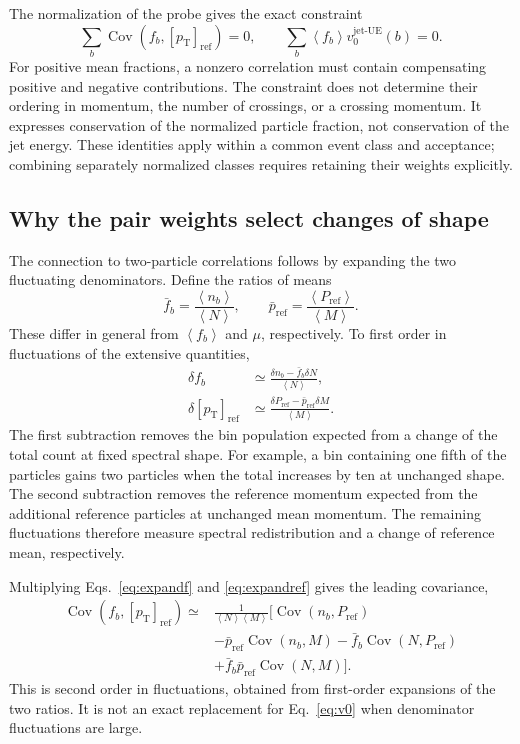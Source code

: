 \documentclass[aps,prc,twocolumn,superscriptaddress,nofootinbib,longbibliography,floatfix,10pt]{revtex4-2}
\newcommand{\vjet}{{v_0^{\mathrm{jet\text{-}UE}}}}
\newcommand{\mpt}{[p_{\mathrm T}]_{\mathrm{ref}}}
\newcommand{\av}[1]{\left\langle #1\right\rangle}
\newcommand{\Cov}{\operatorname{Cov}}
\begin{document}
The normalization of the probe gives the exact constraint
\begin{equation}
 \sum_b\Cov(f_b,\mpt)=0,\qquad
 \sum_b\av{f_b}\vjet(b)=0.
 \label{eq:sumrule}
\end{equation}
For positive mean fractions, a nonzero correlation must contain compensating positive and negative contributions. The constraint does not determine their ordering in momentum, the number of crossings, or a crossing momentum. It expresses conservation of the normalized particle fraction, not conservation of the jet energy. These identities apply within a common event class and acceptance; combining separately normalized classes requires retaining their weights explicitly.

\subsection{Why the pair weights select changes of shape}
The connection to two-particle correlations follows by expanding the two fluctuating denominators. Define the ratios of means
\begin{equation}
 \bar f_b=\frac{\av{n_b}}{\av N},\qquad
 \bar p_{\mathrm{ref}}=\frac{\av{P_{\mathrm{ref}}}}{\av M}.
 \label{eq:means}
\end{equation}
These differ in general from $\av{f_b}$ and $\mu$, respectively. To first order in fluctuations of the extensive quantities,
\begin{align}
 \delta f_b&\simeq\frac{\delta n_b-\bar f_b\delta N}{\av N},\label{eq:expandf}\\
 \delta\mpt&\simeq\frac{\delta P_{\mathrm{ref}}-\bar p_{\mathrm{ref}}\delta M}{\av M}.
 \label{eq:expandref}
\end{align}
The first subtraction removes the bin population expected from a change of the total count at fixed spectral shape. For example, a bin containing one fifth of the particles gains two particles when the total increases by ten at unchanged shape. The second subtraction removes the reference momentum expected from the additional reference particles at unchanged mean momentum. The remaining fluctuations therefore measure spectral redistribution and a change of reference mean, respectively.

Multiplying Eqs.~\eqref{eq:expandf} and \eqref{eq:expandref} gives the leading covariance,
\begin{align}
 \Cov(f_b,\mpt)\simeq{}&\frac{1}{\av N\av M}\Big[\Cov(n_b,P_{\mathrm{ref}})\nonumber\\
 &-\bar p_{\mathrm{ref}}\Cov(n_b,M)
 -\bar f_b\Cov(N,P_{\mathrm{ref}})\nonumber\\
 &+\bar f_b\bar p_{\mathrm{ref}}\Cov(N,M)\Big].
 \label{eq:fourterms}
\end{align}
This is second order in fluctuations, obtained from first-order expansions of the two ratios. It is not an exact replacement for Eq.~\eqref{eq:v0} when denominator fluctuations are large.
\end{document}
